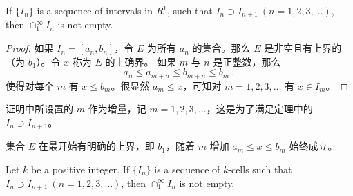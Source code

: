 \documentclass[../poma-notes.tex]{subfiles}
\begin{document}
\begin{theorem}
  If $\{I_n\}$ is a sequence of intervals in $R^1$, such that $I_n \supset I_{n+1} \ (n=1,2,3,\dots)$, then
  $\cap_1^{\infty} I_n$ is not empty.
\end{theorem}

\begin{proof}
  如果 $I_n = [a_n,b_n]$，令 $E$ 为所有 $a_n$ 的集合。那么 $E$ 是非空且有上界的（为 $b_1$）。令 $x$ 称为 $E$ 的上确界。
  如果 $m$ 与 $n$ 是正整数，那么
  \[a_n \le a_{m+n} \le b_{m+n} \le b_m \ ,\]
  使得对每个 $m$ 有 $x \le b_m$。很显然 $a_m \le x$，可知对 $m=1,2,3,\dots$ 有 $x \in I_m$。
\end{proof}

\begin{anote}
  证明中所设置的 $m$ 作为增量，记 $m=1,2,3,\dots$，这是为了满足定理中的 $I_n \supset I_{n+1}$。
  \begin{center}
  \end{center}
  集合 $E$ 在最开始有明确的上界，即 $b_1$，随着 $m$ 增加 $a_m \le x \le b_m$ 始终成立。
\end{anote}

\begin{theorem}
  Let $k$ be a positive integer. If $\{I_n\}$ is a sequence of $k$-cells such that $I_n \supset I_{n+1} \ (n=1,2,3,\dots)$,
  then $\cap_1^{\infty} I_n$ is not empty.
\end{theorem}
\end{document}
